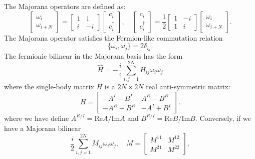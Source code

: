 The Majorana operators are defined as:
\begin{equation}
	\left[\begin{array}{c} \omega_{i} \\ \omega_{i+N} \end{array}\right]
	= \left[\begin{array}{cc} 
		1 & 1 \\ 
		i & -i 
	\end{array}\right] \left[\begin{array}{c} 
		c_i \\ c_i^\dagger 
	\end{array}\right], \quad 
	\left[\begin{array}{c} c_i \\ c_i^\dagger \end{array}\right]
	= \frac{1}{2} \left[\begin{array}{cc} 
		1 & -i \\ 
		1 & i 
	\end{array}\right] \left[\begin{array}{c} 
		\omega_{i} \\ \omega_{i+N}
	\end{array}\right].
\end{equation}
The Majorana operator satisfies the Fermion-like commutation relation
\begin{equation}
	\{\omega_i, \omega_j\} = 2\delta_{ij}.
\end{equation}
The fermionic bilinear in the Majorana basis has the form
\begin{equation}
	\hat H = -\frac{i}{4} \sum_{i,j=1}^{2N} H_{ij} \omega_i \omega_j
\end{equation}
where the single-body matrix $H$ is a $2N \times 2N$ real anti-symmetric matrix:
\begin{equation}
	H = \left[\begin{array}{cc} 
		-A^I - B^I & A^R - B^R \\
    	-A^R - B^R &  -A^I + B^I 
	\end{array}\right].
\end{equation}
where we have define $A^{R/I} = \mathrm{Re} A / \mathrm{Im} A$ and $B^{R/I} = \mathrm{Re} B / \mathrm{Im} B$.
Conversely, if we have a Majorana bilinear 
\begin{equation}
	\frac{i}{2} \sum_{i,j=1}^{2N} M_{ij}\omega_i \omega_j, \quad
	M = \left[\begin{array}{cc}
		M^{11} & M^{12} \\ M^{21} & M^{22}
	\end{array} \right],
\end{equation}
